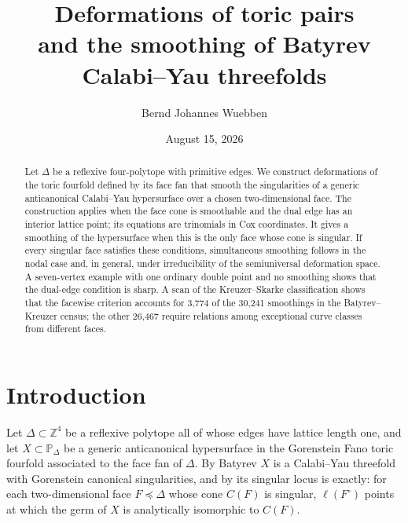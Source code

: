 \documentclass[11pt]{amsart}
\title[Deformations of toric pairs]{Deformations of toric pairs\\ and the
smoothing of Batyrev Calabi--Yau threefolds}
\author{Bernd Johannes Wuebben}
\date{August 15, 2026}
\theoremstyle{definition}
\theoremstyle{remark}
\newcommand{\ZZ}{\mathbb{Z}}
\newcommand{\PP}{\mathbb{P}}
\begin{document}
\begin{abstract}
Let $\Delta$ be a reflexive four-polytope with primitive edges. We
construct deformations of the toric fourfold defined by its face fan
that smooth the singularities of a generic anticanonical Calabi--Yau
hypersurface over a chosen two-dimensional face. The construction applies
when the face cone is smoothable and the dual edge has an interior
lattice point; its equations are trinomials in Cox coordinates. It gives
a smoothing of the hypersurface when this is the only face whose cone
is singular. If every singular face satisfies these conditions,
simultaneous smoothing follows in the nodal case and, in general, under
irreducibility of the semiuniversal deformation space. A seven-vertex
example with one ordinary double point and no smoothing shows that the
dual-edge condition is sharp. A scan of the Kreuzer--Skarke classification
shows that the facewise criterion
accounts for 3,774 of the 30,241 smoothings in the Batyrev--Kreuzer census;
the other 26,467 require relations among exceptional curve classes from
different faces.
\end{abstract}

\maketitle

\section{Introduction}\label{sec:intro}

Let $\Delta \subset \ZZ^4$ be a reflexive polytope all of whose edges have
lattice length one, and let $X \subset \PP_\Delta$ be a generic
anticanonical hypersurface in the Gorenstein Fano toric fourfold
associated to the face fan of $\Delta$.  By Batyrev \cite{Batyrev94} $X$
is a Calabi--Yau threefold with Gorenstein canonical singularities, and by
\cite[Prop.~3.1]{paper1} its singular locus
is exactly: for each two-dimensional face $F \preceq \Delta$ whose cone
$C(F)$ is singular, $\ell(F^\circ)$ points at which the germ of $X$ is
analytically isomorphic to $C(F)$.
\end{document}
